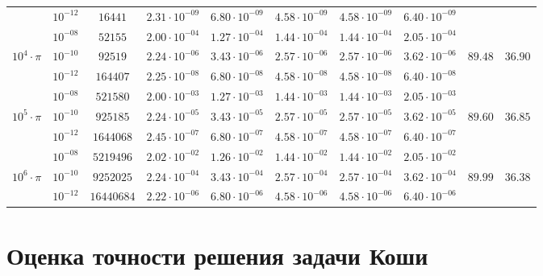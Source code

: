 \documentclass[a4paper,12pt]{article}
\begin{document}
\begin{table}[H]
\begin{tabular}{|c|c|c|c|c|c|c|c|c|c|}
    \cline{2-8}
    &$10^{-12}$&$ 16441$&$  2.31\cdot 10^{-09}$&$  6.80\cdot 10^{-09}$&$  4.58\cdot 10^{-09}$&$  4.58\cdot 10^{-09}$&$  6.40\cdot 10^{-09}$& &\\
    \cline{1-10}
    &$10^{-08}$&$ 52155$&$  2.00\cdot 10^{-04}$&$  1.27\cdot 10^{-04}$&$  1.44\cdot 10^{-04}$&$  1.44\cdot 10^{-04}$&$  2.05\cdot 10^{-04}$& &\\
    \cline{2-8}
    $10^4 \cdot \pi$&$10^{-10}$&$ 92519$&$  2.24\cdot 10^{-06}$&$  3.43\cdot 10^{-06}$&$  2.57\cdot 10^{-06}$&$  2.57\cdot 10^{-06}$&$  3.62\cdot 10^{-06}$&$89.48$&$36.90$\\
    \cline{2-8}
    &$10^{-12}$&$ 164407$&$  2.25\cdot 10^{-08}$&$  6.80\cdot 10^{-08}$&$  4.58\cdot 10^{-08}$&$  4.58\cdot 10^{-08}$&$  6.40\cdot 10^{-08}$& &\\
    \cline{1-10}
    &$10^{-08}$&$ 521580$&$  2.00\cdot 10^{-03}$&$  1.27\cdot 10^{-03}$&$  1.44\cdot 10^{-03}$&$  1.44\cdot 10^{-03}$&$  2.05\cdot 10^{-03}$& &\\
    \cline{2-8}
    $10^5 \cdot \pi$&$10^{-10}$&$ 925185$&$  2.24\cdot 10^{-05}$&$  3.43\cdot 10^{-05}$&$  2.57\cdot 10^{-05}$&$  2.57\cdot 10^{-05}$&$  3.62\cdot 10^{-05}$&$89.60$&$36.85$\\
    \cline{2-8}
    &$10^{-12}$&$ 1644068$&$  2.45\cdot 10^{-07}$&$  6.80\cdot 10^{-07}$&$  4.58\cdot 10^{-07}$&$  4.58\cdot 10^{-07}$&$  6.40\cdot 10^{-07}$& &\\
    \cline{1-10}
    &$10^{-08}$&$ 5219496$&$  2.02\cdot 10^{-02}$&$  1.26\cdot 10^{-02}$&$  1.44\cdot 10^{-02}$&$  1.44\cdot 10^{-02}$&$  2.05\cdot 10^{-02}$& &\\
    \cline{2-8}
    $10^6 \cdot \pi$&$10^{-10}$&$ 9252025$&$  2.24\cdot 10^{-04}$&$  3.43\cdot 10^{-04}$&$  2.57\cdot 10^{-04}$&$  2.57\cdot 10^{-04}$&$  3.62\cdot 10^{-04}$&$89.99$&$36.38$\\
    \cline{2-8}
    &$10^{-12}$&$ 16440684$&$  2.22\cdot 10^{-06}$&$  6.80\cdot 10^{-06}$&$  4.58\cdot 10^{-06}$&$  4.58\cdot 10^{-06}$&$  6.40\cdot 10^{-06}$& &\\
    \cline{1-10}
\end{tabular}
\end{table}
\newpage

\section{Оценка точности решения задачи Коши}
\end{document}
